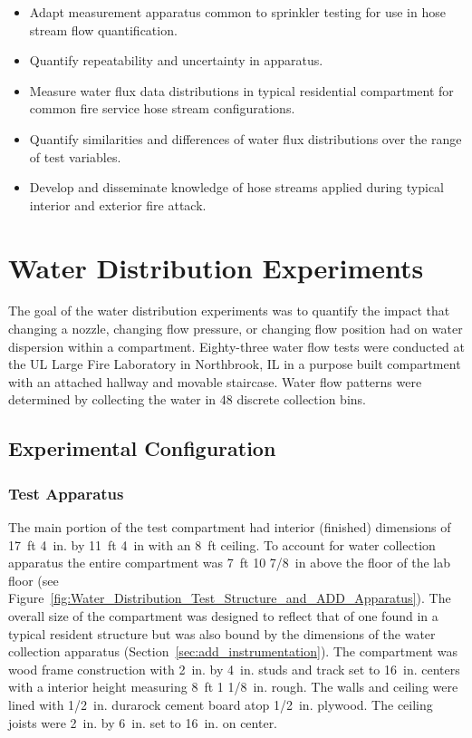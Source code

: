 \documentclass[12pt,oneside]{book}
\begin{document}
\begin{itemize}
	\setlength{\itemindent}{0.25in}
	\item Adapt measurement apparatus common to sprinkler testing for use in hose stream flow quantification.
	\item Quantify repeatability and uncertainty in apparatus.
	\item Measure water flux data distributions in typical residential compartment for common fire service hose stream configurations.
	\item Quantify similarities and differences of water flux distributions over the range of test variables.
	\item Develop and disseminate knowledge of hose streams applied during typical interior and exterior fire attack.
	\end{itemize}


\chapter{Water Distribution Experiments}

The goal of the water distribution experiments was to quantify the impact that changing a nozzle, changing flow pressure, or changing flow position had on water dispersion within a compartment. Eighty-three water flow tests were conducted at the UL Large Fire Laboratory in Northbrook, IL in a purpose built compartment with an attached hallway and movable staircase. Water flow patterns were determined by collecting the water in 48 discrete collection bins.

\section{Experimental Configuration}

\subsection{Test Apparatus}
\label{ADD_discussion}
The main portion of the test compartment had interior (finished) dimensions of 17~ft 4~in. by 11~ft 4~in with an 8~ft ceiling. To account for water collection apparatus the entire compartment was 7~ft 10 7/8~in above the floor of the lab floor (see Figure~\ref{fig:Water_Distribution_Test_Structure_and_ADD_Apparatus}). The overall size of the compartment was designed to reflect that of one found in a typical resident structure but was also bound by the dimensions of the water collection apparatus (Section~\ref{sec:add_instrumentation}). The compartment was wood frame construction with 2~in. by 4~in. studs and track set to 16~in. centers with a interior height measuring 8~ft 1 1/8~in. rough. The walls and ceiling were lined with 1/2~in. durarock cement board atop 1/2~in. plywood. The ceiling joists were 2~in. by 6~in. set to 16~in. on center.
\end{document}
